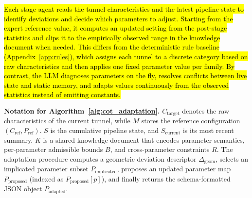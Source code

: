 \documentclass[a4paper,fleqn]{cas-dc}
\begin{document}
{\hl{Each stage agent reads the tunnel characteristics and the latest pipeline state to identify deviations and decide which parameters to adjust. Starting from the expert reference value, it computes an updated setting from the post-stage statistics and clips it to the empirically observed range in the knowledge document when needed. This differs from the deterministic rule baseline (Appendix~\ref{app:rules}), which assigns each tunnel to a discrete category based on raw characteristics and then applies one fixed parameter value per family. By contrast, the LLM diagnoses parameters on the fly, resolves conflicts between live state and static memory, and adapts values continuously from the observed statistics instead of emitting constants.}

\noindent\textbf{Notation for Algorithm~\ref{alg:cot_adaptation}.} $C_{\text{target}}$ denotes the raw characteristics of the current tunnel, while $M$ stores the reference configuration $(C_{\text{ref}}, P_{\text{ref}})$. $S$ is the cumulative pipeline state, and $S_{\text{current}}$ is its most recent summary. $K$ is a shared knowledge document that encodes parameter semantics, per-parameter admissible bounds $B$, and cross-parameter constraints $R$. The adaptation procedure computes a geometric deviation descriptor $\Delta_{\text{geom}}$, selects an implicated parameter subset $P_{\text{implicated}}$, proposes an updated parameter map $P_{\text{proposed}}$ (indexed as $P_{\text{proposed}}[p]$), and finally returns the schema-formatted JSON object $P_{\text{adapted}}$.

}
\end{document}
